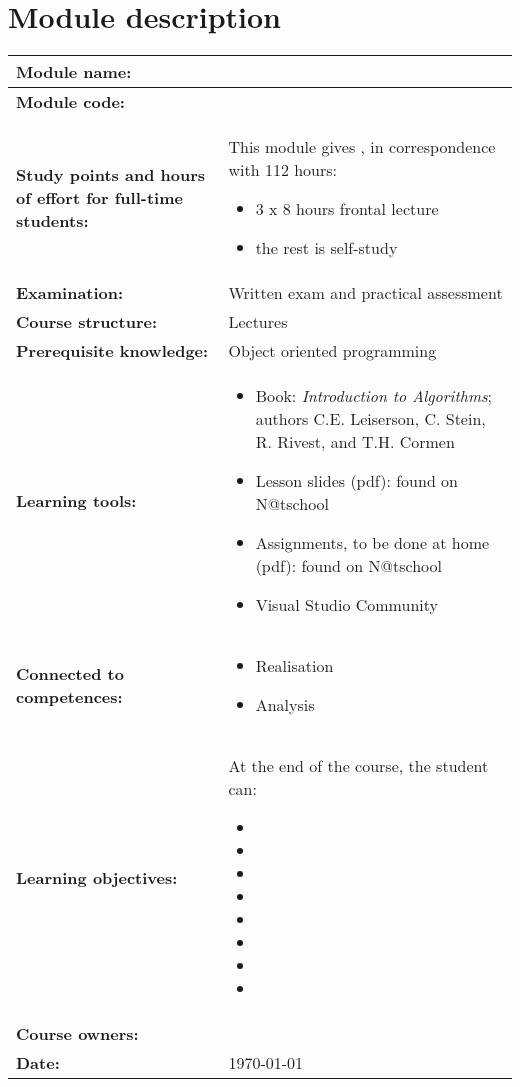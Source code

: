 \section*{Module description}
\begin{tabularx}{\textwidth}{|>{\columncolor{lichtGrijs}} p{}|X|}
	\hline
	\textbf{Module name:} & \modulenaam\\
	\hline
	\textbf{Module code: }& \modulecode\\
	\hline
	\textbf{Study points \newline and hours of effort for full-time students:} & This module gives \stdPunten, in correspondence with 112 hours:
	\begin{itemize}
		\item 3 x 8 hours frontal lecture
		\item the rest is self-study
	\end{itemize} \\
	\hline
	\textbf{Examination:} & Written exam and practical assessment \\
	\hline
	\textbf{Course structure:} & Lectures \\
	\hline
	\textbf{Prerequisite knowledge:} & Object oriented programming \\
	\hline
	\textbf{Learning tools:} & \begin{itemize}
			\item Book: \textit{Introduction to Algorithms}; authors
			C.E. Leiserson, C. Stein, R. Rivest, and T.H. Cormen
			\item Lesson slides (pdf): found on N@tschool
			\item Assignments, to be done at home (pdf): found on N@tschool
			\item Visual Studio Community
		\end{itemize} \\
	\hline
	\textbf{Connected to \newline competences:} & \begin{itemize}
			\item Realisation
			\item Analysis
		\end{itemize} \\
	\hline
	\textbf{Learning objectives:} &
		At the end of the course, the student can:
			\begin{itemize}
				\item \lga
				\item \lgb
				\item \lgc
				\item \lgd
				\item \lge 
				\item \lgf
				\item \lgg
				\item \lgh
			\end{itemize} \\
	\hline

	\textbf{Course owners:} & \author\\
	\hline
	\textbf{Date:} & \today \\
	\hline
\end{tabularx}
\newpage

